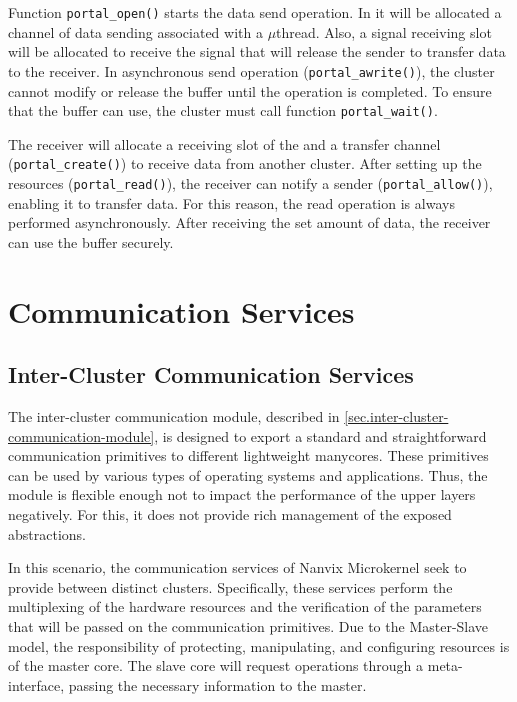 				Function \texttt{portal\_open()} starts the data send operation.
				In it will be allocated a channel of data sending associated with
				a $\mu$thread.
				Also, a signal receiving slot will be allocated to receive the
				signal that will release the sender to transfer data to the receiver.
				In asynchronous send operation (\texttt{portal\_awrite()}), the cluster
				cannot modify or release the buffer until the operation is completed.
				To ensure that the buffer can use, the cluster must call function \texttt{portal\_wait()}.

				The receiver will allocate a receiving slot of the \dnoc and a transfer
				channel (\texttt{portal\_create()}) to receive data from another cluster.
				After setting up the resources (\texttt{portal\_read()}), the receiver
				can notify a sender (\texttt{portal\_allow()}), enabling it to transfer data.
				For this reason, the read operation is always performed asynchronously.
				After receiving the set amount of data, the receiver can use the buffer securely.

	
	\section{Communication Services}
	\label{sec.comm-services}

		\subsection{Inter-Cluster Communication Services}
		\label{sec.inter-cluster-communication-module}

			The inter-cluster communication module, described in \autoref{sec.inter-cluster-communication-module},
			is designed to export a standard and straightforward communication
			primitives to different lightweight manycores.
			These primitives can be used by various types of operating systems
			and applications.
			Thus, the module is flexible enough not to impact the performance
			of the upper layers negatively.
			For this, it does not provide rich management of the exposed abstractions.

			In this scenario, the communication services of Nanvix Microkernel seek
			to provide \ipc between distinct clusters.
			Specifically, these services perform the multiplexing of the hardware
			resources and the verification of the parameters that will be passed
			on the communication primitives.
			Due to the Master-Slave model, the responsibility of protecting,
			manipulating, and configuring \hal resources is of the master core.
			The slave core will request operations through a meta-interface,
			passing the necessary information to the master.

